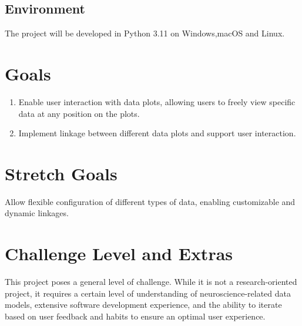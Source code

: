 \documentclass{article}
\begin{document}
\subsection{Environment}
The project will be developed in Python 3.11 on Windows,macOS and Linux.


\section{Goals}
\begin{enumerate}
    \item Enable user interaction with data plots, allowing users to freely view specific data at any position on the plots.
    \item Implement linkage between different data plots and support user interaction.
\end{enumerate}
\section{Stretch Goals}
Allow flexible configuration of different types of data, enabling customizable and dynamic linkages.
\section{Challenge Level and Extras}

This project poses a general level of challenge. While it is not a research-oriented project, it requires a certain level of understanding of neuroscience-related data models, extensive software development experience, and the ability to iterate based on user feedback and habits to ensure an optimal user experience.
\end{document}
